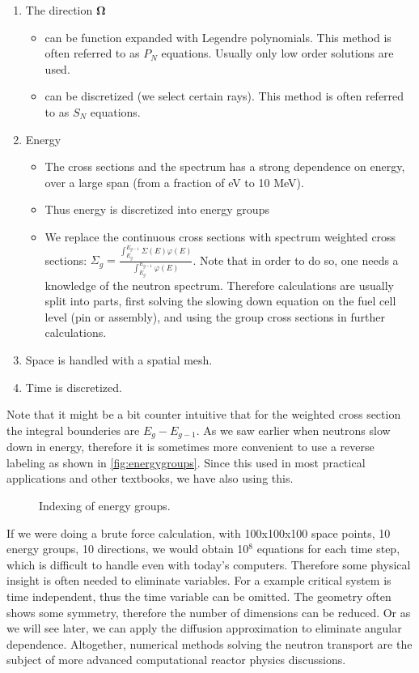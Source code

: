 \begin{enumerate}
\item The direction $\mathbf{\Omega}$
\begin{itemize}
\item can be function expanded with Legendre polynomials. This method is often referred to as $P_N$ equations. Usually only low order solutions are used.
\item can be discretized (we select certain rays). This method is often referred to as $S_N$ equations.
\end{itemize}
\item Energy
\begin{itemize}
\item The cross sections and the spectrum has a strong dependence on energy, over a large span (from a fraction of eV to 10 MeV).
\item Thus energy is discretized into energy groups
\item We replace the continuous cross sections with spectrum weighted cross sections: $\Sigma_g=\frac{\int_{E_g}^{E_{g-1}}\Sigma(E)\varphi(E)}{\int_{E_g}^{E_{g-1}}\varphi(E)}$. Note that in order to do so, one needs a knowledge of the neutron spectrum. Therefore calculations are usually split into parts, first solving the slowing down equation on the fuel cell level (pin or assembly), and using the group cross sections in further calculations.
\end{itemize}
\item Space is handled with a spatial mesh.
\item Time is discretized.
\end{enumerate}

Note that it might be a bit counter intuitive that for the weighted cross section the integral bounderies are $E_g - E_{g-1}$. As we saw earlier when neutrons slow down in energy, therefore it is sometimes more convenient to use a reverse labeling as shown in \autoref{fig:energygroups}. Since this used in most practical applications and other textbooks, we have also using this.

\begin{figure}[ht!]
\protect {}\protect
\caption{\label{fig:energygroups} \footnotesize{Indexing of energy groups.}}
\end{figure} 


If we were doing a brute force calculation, with 100x100x100 space points, 10 energy groups, 10 directions, we would obtain 10$^8$ equations for each time step, which is difficult to handle even with today's computers. Therefore some physical insight is often needed to eliminate variables. For a example critical system is time independent, thus the time variable can be omitted. The geometry often shows some symmetry, therefore the number of dimensions can be reduced. Or as we will see later, we can apply the diffusion approximation to eliminate angular dependence. Altogether, numerical methods solving the neutron transport are the subject of more advanced computational reactor physics discussions.

